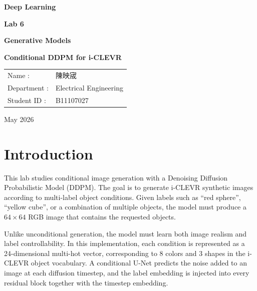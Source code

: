 \documentclass[12pt,a4paper]{article}
\begin{document}
\begin{titlepage}
    \centering
    \vspace*{2cm}

    {\Huge \textbf{Deep Learning} \par}

    \vspace{2.5cm}

    {\Huge \textbf{Lab 6} \par}
    \vspace{0.5cm}
    {\Huge \textbf{Generative Models} \par}
    \vspace{0.5cm}
    {\Huge \textbf{Conditional DDPM for i-CLEVR} \par}

    \vspace{4cm}

    {\Large
    \begin{tabular}{ll}
    Name :        & 陳映宬 \\
    Department :  & Electrical Engineering \\
    Student ID :  & B11107027 \\
    \end{tabular}
    \par}

    \vfill

    {\Large May 2026 \par}
\end{titlepage}

\newpage
\tableofcontents
\newpage

\section{Introduction}

This lab studies conditional image generation with a Denoising Diffusion
Probabilistic Model (DDPM).  The goal is to generate i-CLEVR synthetic images
according to multi-label object conditions.  Given labels such as ``red
sphere'', ``yellow cube'', or a combination of multiple objects, the model must
produce a $64 \times 64$ RGB image that contains the requested objects.

Unlike unconditional generation, the model must learn both image realism and
label controllability.  In this implementation, each condition is represented
as a 24-dimensional multi-hot vector, corresponding to 8 colors and 3 shapes in
the i-CLEVR object vocabulary.  A conditional U-Net predicts the noise added to
an image at each diffusion timestep, and the label embedding is injected into
every residual block together with the timestep embedding.
\end{document}
